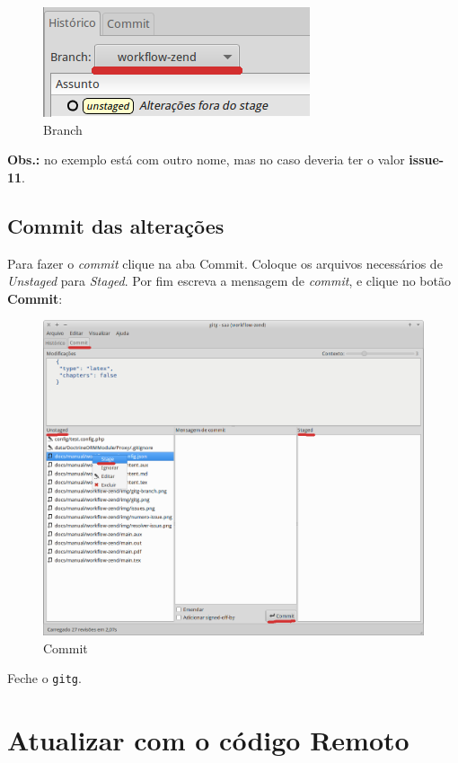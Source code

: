 \begin{figure}[H]
    \includegraphics[scale=1.0]{img/gitg-branch.png}
    \caption{Branch}
\end{figure}

\textbf{Obs.:} no exemplo está com outro nome, mas no caso deveria ter o
valor \textbf{issue-11}.

\subsection{Commit das alterações}\label{commit-das-alterauxe7uxf5es}

Para fazer o \emph{commit} clique na aba Commit. Coloque os arquivos
necessários de \emph{Unstaged} para \emph{Staged}. Por fim escreva a
mensagem de \emph{commit}, e clique no botão \textbf{Commit}:

\begin{figure}[H]
    \includegraphics[scale=0.4]{img/gitg-commit.png}
    \caption{Commit}
\end{figure}

Feche o \texttt{gitg}.

\section{Atualizar com o código
Remoto}\label{atualizar-com-o-cuxf3digo-remoto}

